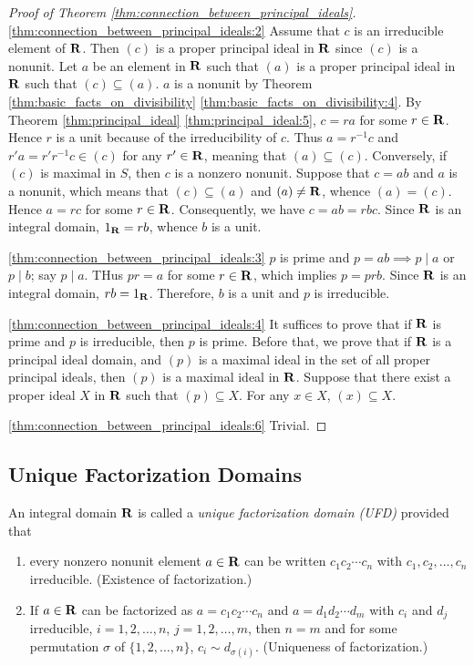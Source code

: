 \begin{proof}[Proof of Theorem \ref{thm:connection_between_principal_ideals}]
\ref{thm:connection_between_principal_ideals:2} 
Assume that $c$ is an irreducible element of $\mathbf{R}$. 
Then $(c)$ is a proper principal ideal in $\mathbf{R}$ since $(c)$ is a nonunit. 
Let $a$ be an element in $\mathbf{R}$ such that $(a)$ is a proper principal ideal 
in $\mathbf{R}$ such that $(c) \subseteq (a)$. 
$a$ is a nonunit by Theorem \ref{thm:basic_facts_on_divisibility}
\ref{thm:basic_facts_on_divisibility:4}. 
By Theorem \ref{thm:principal_ideal} \ref{thm:principal_ideal:5}, $c = ra$ 
for some $r \in \mathbf{R}$. Hence $r$ is a unit because of the irreducibility of 
$c$. Thus $a = r^{-1} c$ and $r' a = r' r^{-1} c \in (c)$ for any $r' \in 
\mathbf{R}$, meaning that $(a) \subseteq (c)$. 
Conversely, if $(c)$ is maximal in $S$, then $c$ is a nonzero nonunit. 
Suppose that $c = ab$ and $a$ is a nonunit, which means that $(c) \subseteq 
(a)$ and $(a) \neq \mathbf{R}$, whence $(a) = (c)$. Hence $a = rc$ for some $r 
\in \mathbf{R}$. 
Consequently, we have $c = ab = rbc$. 
Since $\mathbf{R}$ is an integral domain, $1_{\mathbf{R}} = rb$, whence $b$ is a unit. 

\ref{thm:connection_between_principal_ideals:3} 
$p$ is prime and $p = ab \implies p \mid a$ or $p \mid b$; say $p \mid a$. 
THus $pr = a$ for some $r \in \mathbf{R}$, which implies $p = prb$. 
Since $\mathbf{R}$ is an integral domain, $rb = 1_{\mathbf{R}}$. 
Therefore,  $b$ is a unit and $p$ is irreducible. 

\ref{thm:connection_between_principal_ideals:4}
It suffices to prove that if $\mathbf{R}$ is prime and $p$ is irreducible, then 
$p$ is prime. 
Before that, we prove that if $\mathbf{R}$ is a principal ideal domain, and 
$(p)$ is a maximal ideal in the set of all proper principal ideals, then 
$(p)$ is a maximal ideal in $\mathbf{R}$. 
Suppose that there exist a proper ideal $X$ in $\mathbf{R}$ such that 
$(p) \subseteq X$. For any $x \in X$, $(x) \subseteq X$. 

\ref{thm:connection_between_principal_ideals:6}
Trivial. 
\end{proof}

\subsection{Unique Factorization Domains}
\begin{defn}
An integral domain $\mathbf{R}$ is called a \emph{unique factorization domain 
(UFD)} provided that 
\begin{enumerate}
    \item every nonzero nonunit element $a \in \mathbf{R}$ can be written 
    $c_1c_2\cdots c_n$ with $c_1, c_2, \ldots, c_n$ irreducible. 
    (Existence of factorization.)
    \item If $a \in \mathbf{R}$ can be factorized as $a = c_1c_2\cdots c_n$ and 
    $a = d_1d_2 \cdots d_m$ with $c_i$ and $d_j$ irreducible, $i=1, 2, 
    \ldots, n$, $j=1, 2, \ldots, m$, then $n = m $ and for some permutation 
    $\sigma$ of $\{1, 2, \ldots, n\}$, $c_i \sim d_{\sigma(i)}$. 
    (Uniqueness of factorization.)
\end{enumerate}
\end{defn}

